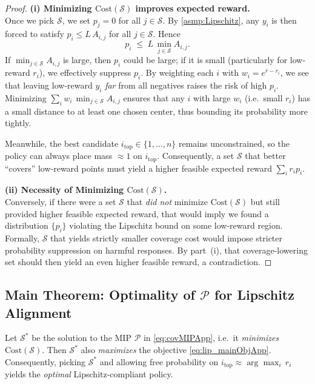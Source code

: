 \begin{proof}
\textbf{(i) Minimizing \(\mathrm{Cost}(\mathcal{S})\) improves expected reward.}\\
Once we pick \(\mathcal{S}\), we set \(p_j=0\) for all \(j\in \mathcal{S}\). By \ref{asmp:Lipschitz}, any \(y_i\) is then forced to satisfy \(p_i \le L\,A_{i,j}\) for all \(j\in \mathcal{S}\). Hence
\[
p_i 
\;\le\; 
L \,\min_{j\in \mathcal{S}} A_{i,j}.
\]
If \(\min_{j\in \mathcal{S}} A_{i,j}\) is large, then \(p_i\) could be large; if it is small (particularly for low-reward \(r_i\)), we effectively suppress \(p_i\). By weighting each \(i\) with \(w_i = e^{\overline{r}-r_i}\), we see that leaving low-reward \(y_i\) \emph{far} from all negatives raises the risk of high \(p_i\). Minimizing \(\sum_i w_i\,\min_{j\in \mathcal{S}} A_{i,j}\) ensures that any \(i\) with large \(w_i\) (i.e.\ small \(r_i\)) has a small distance to at least one chosen center, thus bounding its probability more tightly. 

Meanwhile, the best candidate \(i_{\mathrm{top}} \in \{1,\dots,n\}\) remains unconstrained, so the policy can always place mass \(\approx 1\) on \(i_{\mathrm{top}}.\) Consequently, a set \(\mathcal{S}\) that better ``covers'' low-reward points must yield a higher feasible expected reward \(\sum_i r_i p_i\). 

\textbf{(ii) Necessity of Minimizing \(\mathrm{Cost}(\mathcal{S})\).}\\
Conversely, if there were a set \(\mathcal{S}\) that \emph{did not} minimize \(\mathrm{Cost}(\mathcal{S})\) but still provided higher feasible expected reward, that would imply we found a distribution \(\{p_i\}\) violating the Lipschitz bound on some low-reward region. Formally, \(\mathcal{S}\) that yields strictly smaller coverage cost would impose stricter probability suppression on harmful responses. By part~(i), that coverage-lowering set should then yield an even higher feasible reward, a contradiction.
\end{proof}

\subsection{Main Theorem: Optimality of \(\mathcal{P}\) for Lipschitz Alignment}

\begin{theorem}
\label{thm:appOptNegatives}
Let \(\mathcal{S}^*\) be the solution to the MIP \(\mathcal{P}\) in \eqref{eq:covMIPApp}, i.e.\ it \emph{minimizes} \(\mathrm{Cost}(\mathcal{S})\). Then \(\mathcal{S}^*\) also \emph{maximizes} the objective \eqref{eq:lip_mainObjApp}. Consequently, picking \(\mathcal{S}^*\) and allowing free probability on \(i_{\mathrm{top}} \approx \arg\max_i\, r_i\) yields the \emph{optimal} Lipschitz-compliant policy.
\end{theorem}

